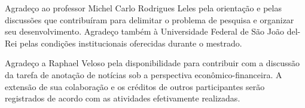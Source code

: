 \begin{folhadeaprovacao}

  \begin{center}
    {\ABNTEXchapterfont\large\imprimirautor}

    \vspace*{\fill}\vspace*{\fill}
    {\ABNTEXchapterfont\bfseries\Large\imprimirtitulo}
    \vspace*{\fill}

    \hspace{.45\textwidth}
    \begin{minipage}{.5\textwidth}
        \imprimirpreambulo
    \end{minipage}%
    \vspace*{\fill}
   \end{center}


   \begin{center}
    \vspace*{0.5cm}
    {\large\imprimirlocal}
    \par
    {\large\imprimirdata}
    \vspace*{1cm}
  \end{center}

\end{folhadeaprovacao}

\begin{agradecimentos}
Agradeço ao professor Michel Carlo Rodrigues Leles pela orientação e pelas discussões que contribuíram para delimitar o problema de pesquisa e organizar seu desenvolvimento. Agradeço também à Universidade Federal de São João del-Rei pelas condições institucionais oferecidas durante o mestrado.

Agradeço a Raphael Veloso pela disponibilidade para contribuir com a discussão da tarefa de anotação de notícias sob a perspectiva econômico-financeira. A extensão de sua colaboração e os créditos de outros participantes serão registrados de acordo com as atividades efetivamente realizadas.
\end{agradecimentos}

